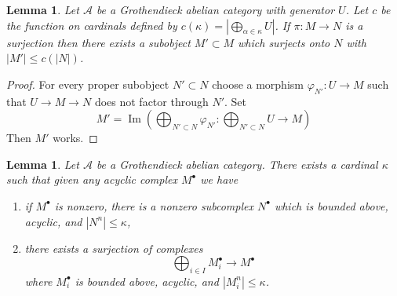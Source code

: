 \documentclass{stacks-project}
\theoremstyle{plain}
\newtheorem{lemma}[subsection]{Lemma}
\theoremstyle{definition}
\theoremstyle{remark}
\numberwithin{equation}{subsection}
\def\Im{\mathop{\mathrm{Im}}}
\begin{document}
\begin{lemma}
\label{lemma-surjection-bounded-size}
Let $\mathcal{A}$ be a Grothendieck abelian category with generator $U$.
Let $c$ be the function on cardinals defined by
$c(\kappa) = |\bigoplus_{\alpha \in \kappa} U|$. If $\pi : M \to N$ is a
surjection then there exists a subobject $M' \subset M$ which surjects
onto $N$ with $|M'| \leq c(|N|)$.
\end{lemma}

\begin{proof}
For every proper subobject $N' \subset N$ choose a morphism
$\varphi_{N'} : U \to M$ such that $U \to M \to N$ does not factor
through $N'$. Set
$$
M' = \Im\left(
\bigoplus\nolimits_{N' \subset N} \varphi_{N'} :
\bigoplus\nolimits_{N' \subset N} U \longrightarrow M\right)
$$
Then $M'$ works.
\end{proof}

\begin{lemma}
\label{lemma-acyclic-quotient-complexes-bounded-size}
Let $\mathcal{A}$ be a Grothendieck abelian category. There exists a cardinal
$\kappa$ such that given any acyclic complex $M^\bullet$ we have
\begin{enumerate}
\item if $M^\bullet$ is nonzero, there is a nonzero subcomplex
$N^\bullet$ which is bounded above, acyclic, and $|N^n| \leq \kappa$,
\item there exists a surjection of complexes
$$
\bigoplus\nolimits_{i \in I} M_i^\bullet \longrightarrow M^\bullet
$$
where $M_i^\bullet$ is bounded above, acyclic, and $|M_i^n| \leq \kappa$.
\end{enumerate}
\end{lemma}
\end{document}
